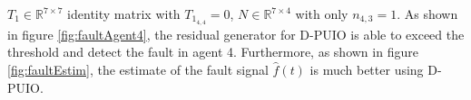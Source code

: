 \documentclass[letterpaper, 10 pt, conference]{ieeeconf}  %
\def\R{\mathbb{R}}
\newcommand{\ie}{\textit{i}.\textit{e}., }
\begin{document}
$T_1 \in \R^{7 \times 7}$ identity matrix with $T_{1_{4,4}}=0$, $N \in \R^{7 \times 4}$ with only $n_{4,3} = 1$. 
As  shown in figure \ref{fig:faultAgent4}, the residual generator for D-PUIO is able to exceed the threshold and detect the fault in agent 4. Furthermore, as shown in figure \ref{fig:faultEstim}, the estimate of the fault signal $\hat{f}(t)$ is much better using D-PUIO.  
\end{document}
